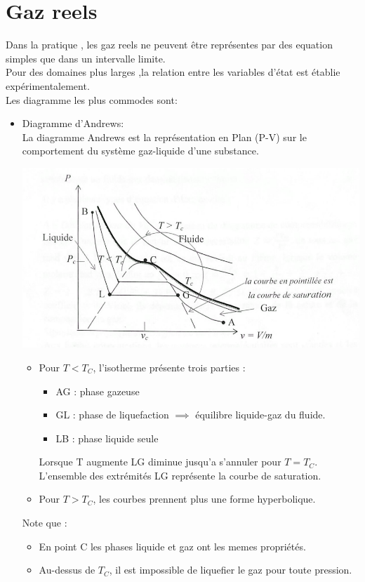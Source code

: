 \documentclass[12pt,oneside]{book}
\begin{document}
\section{Gaz reels}
Dans la pratique , les gaz reels ne peuvent être représentes par des equation simples que dans un intervalle limite.\\
Pour des domaines plus larges ,la relation entre les variables d’état est établie expérimentalement.\\
Les diagramme les plus commodes sont:
\begin{itemize}
    \item Diagramme d'Andrews:\\
          La diagramme Andrews est la représentation en Plan (P-V) sur le comportement du système gaz-liquide d'une substance.
          \begin{center}
              \includegraphics[width=0.6\linewidth]{../pic/3300/7.png}
          \end{center}
          \begin{itemize}
              \item Pour $T < T_C$, l'isotherme présente trois parties :
                    \begin{itemize}
                        \item AG : phase gazeuse
                        \item GL : phase de liquefaction $\implies$ équilibre liquide-gaz du fluide.
                        \item LB : phase liquide seule
                    \end{itemize}
                    Lorsque T augmente LG diminue jusqu'a s'annuler pour $T = T_C$.\\
                    L'ensemble des extrémités LG représente la courbe de saturation.
              \item  Pour $T > T_C$, les courbes prennent plus une forme hyperbolique.
          \end{itemize}
          Note que :
          \begin{itemize}
              \item En point C les phases liquide et gaz ont les memes propriétés.
              \item Au-dessus de $T_C$, il est impossible de liquefier le gaz pour toute pression.
          \end{itemize}
\end{itemize}
\end{document}
